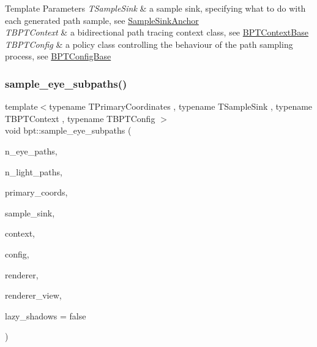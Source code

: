 \begin{DoxyTemplParams}{Template Parameters}
{\em T\+Sample\+Sink} & a sample sink, specifying what to do with each generated path sample, see \hyperlink{struct_sample_sink_base_SampleSinkAnchor}{Sample\+Sink\+Anchor} \\
\hline
{\em T\+B\+P\+T\+Context} & a bidirectional path tracing context class, see \hyperlink{struct_b_p_t_context_base}{B\+P\+T\+Context\+Base} \\
\hline
{\em T\+B\+P\+T\+Config} & a policy class controlling the behaviour of the path sampling process, see \hyperlink{struct_b_p_t_config_base}{B\+P\+T\+Config\+Base} \\
\hline
\end{DoxyTemplParams}
\mbox{\label{group___b_p_t_lib_ga5dcb245a5dfa3a0910069446d27aa8eb}} 
\subsubsection{\texorpdfstring{sample\+\_\+eye\+\_\+subpaths()}{sample\_eye\_subpaths()}}
{\footnotesize\ttfamily template$<$typename T\+Primary\+Coordinates , typename T\+Sample\+Sink , typename T\+B\+P\+T\+Context , typename T\+B\+P\+T\+Config $>$ \\
void bpt\+::sample\+\_\+eye\+\_\+subpaths (\begin{DoxyParamCaption}\item[{const uint32}]{n\+\_\+eye\+\_\+paths,  }\item[{const uint32}]{n\+\_\+light\+\_\+paths,  }\item[{T\+Primary\+Coordinates}]{primary\+\_\+coords,  }\item[{T\+Sample\+Sink}]{sample\+\_\+sink,  }\item[{T\+B\+P\+T\+Context \&}]{context,  }\item[{const T\+B\+P\+T\+Config \&}]{config,  }\item[{\hyperlink{struct_rendering_context}{Rendering\+Context} \&}]{renderer,  }\item[{\hyperlink{struct_rendering_context_view}{Rendering\+Context\+View} \&}]{renderer\+\_\+view,  }\item[{const bool}]{lazy\+\_\+shadows = {\ttfamily false} }\end{DoxyParamCaption})}

